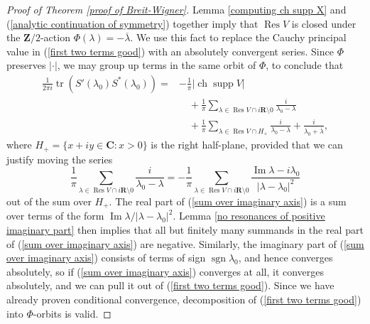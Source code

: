 \documentclass[12pt]{report}
\newcommand{\ZZ}{\mathbf{Z}}
\newcommand{\RR}{\mathbf{R}}
\newcommand{\CC}{\mathbf{C}}
\DeclareMathOperator{\ch}{ch}
\DeclareMathOperator{\Res}{Res}
\DeclareMathOperator{\sgn}{sgn}
\DeclareMathOperator{\supp}{supp}
\newcommand{\tr}{\operatorname{tr}}
\renewcommand{\Im}{\operatorname{Im}}
\theoremstyle{definition}
\begin{document}
\begin{proof}[Proof of Theorem \ref{proof of Breit-Wigner}]
Lemma \ref{computing ch supp X} and (\ref{analytic continuation of symmetry}) together imply that $\Res V$ is closed under the $\ZZ/2$-action $\Phi(\lambda) = -\overline \lambda$.
We use this fact to replace the Cauchy principal value in (\ref{first two terms good}) with an absolutely convergent series.
Since $\Phi$ preserves $|\cdot|$, we may group up terms in the same orbit of $\Phi$, to conclude that
\begin{align*}
\frac{1}{2\pi i}\tr(S'(\lambda_0)S^*(\lambda_0)) = &-\frac{1}{\pi}|\ch \supp V| \\
&\quad+ \frac{1}{\pi} \sum_{\lambda \in \Res V \cap i\RR \setminus 0} \frac{i}{\lambda_0 - \lambda} \\
&\quad+ \frac{1}{\pi} \sum_{\lambda \in \Res V \cap H_+} \frac{i}{\lambda_0 - \lambda} + \frac{i}{\lambda_0 + \overline{\lambda}},
\end{align*}
where $H_+ = \{x + iy \in \CC: x > 0\}$ is the right half-plane, provided that we can justify moving the series
\begin{equation}
\label{sum over imaginary axis}
\frac{1}{\pi} \sum_{\lambda \in \Res V \cap i\RR \setminus 0} \frac{i}{\lambda_0 - \lambda} =
-\frac{1}{\pi} \sum_{\lambda \in \Res V \cap i\RR \setminus 0} \frac{\Im \lambda - i\lambda_0}{|\lambda - \lambda_0|^2}
\end{equation}
out of the sum over $H_+$. The real part of (\ref{sum over imaginary axis}) is a sum over terms of the form $\Im \lambda/|\lambda - \lambda_0|^2$.
Lemma \ref{no resonances of positive imaginary part} then implies that all but finitely many summands in the real part of (\ref{sum over imaginary axis}) are negative.
Similarly, the imaginary part of (\ref{sum over imaginary axis}) consists of terms of sign $\sgn \lambda_0$, and hence converges absolutely,
so if (\ref{sum over imaginary axis}) converges at all, it converges absolutely, and we can pull it out of (\ref{first two terms good}).
Since we have already proven conditional convergence, decomposition of (\ref{first two terms good}) into $\Phi$-orbits is valid.


\end{proof}
\end{document}
